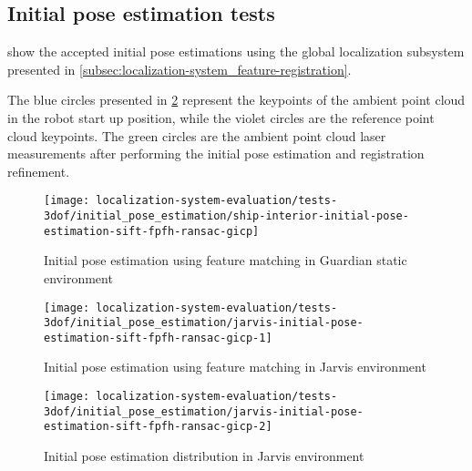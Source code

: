 \subsection{Initial pose estimation tests}

 show the accepted initial pose estimations using the global localization subsystem presented in \cref{subsec:localization-system_feature-registration}.

The blue circles presented in \cref{fig:localization-system-evaluation_jarvis-initial-pose-estimation-sift-fpfh-ransac-gicp-1} represent the keypoints of the ambient point cloud in the robot start up position, while the violet circles are the reference point cloud keypoints. The green circles are the ambient point cloud laser measurements after performing the initial pose estimation and registration refinement.

\begin{figure}[H]
	\centering
	\texttt{[image: localization-system-evaluation/tests-3dof/initial\_pose\_estimation/ship-interior-initial-pose-estimation-sift-fpfh-ransac-gicp]}
	\caption{Initial pose estimation using feature matching in Guardian static environment}
	\label{fig:localization-system-evaluation_ship-interior-initial-pose-estimation-sift-fpfh-ransac-gicp}
\end{figure}

\begin{figure}[H]
	\centering
	\texttt{[image: localization-system-evaluation/tests-3dof/initial\_pose\_estimation/jarvis-initial-pose-estimation-sift-fpfh-ransac-gicp-1]}
	\caption{Initial pose estimation using feature matching in Jarvis environment}
	\label{fig:localization-system-evaluation_jarvis-initial-pose-estimation-sift-fpfh-ransac-gicp-1}
\end{figure}

\begin{figure}[H]
	\centering
	\texttt{[image: localization-system-evaluation/tests-3dof/initial\_pose\_estimation/jarvis-initial-pose-estimation-sift-fpfh-ransac-gicp-2]}
	\caption{Initial pose estimation distribution in Jarvis environment}
	\label{fig:localization-system-evaluation_jarvis-initial-pose-estimation-sift-fpfh-ransac-gicp-2}
\end{figure}



